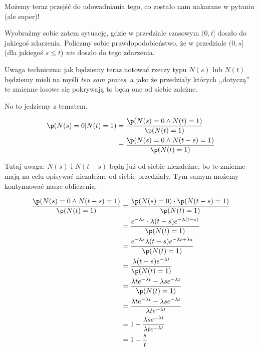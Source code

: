 Możemy teraz przejść do udowadniania tego, co zostało nam nakazane w pytaniu (ale super)!

Wyobraźmy sobie zatem sytuację, gdzie w przedziale czasowym \((0, t]\) doszło do jakiegoś zdarzenia. Policzmy sobie prawdopodobieństwo, że w przedziale \((0, s]\) (dla jakiegoś \(s \leq t\)) \textit{nie} doszło do tego zdarzenia.

Uwaga techniczna: jak będziemy teraz notować rzeczy typu \(N(s)\) lub \(N(t)\) będziemy mieli na myśli \textit{ten sam proces}, a jako że przedziały których ,,dotyczą'' te zmienne losowe się pokrywają to będą one od siebie zależne.

No to jedziemy z tematem.

\begin{align*}
	\p(N(s)=0 | N(t)=1) & = \frac{\p(N(s)=0 \land N(t)=1)}{\p(N(t)=1)}   \\
	                    & = \frac{\p(N(s)=0 \land N(t-s)=1)}{\p(N(t)=1)}
\end{align*}

Tutaj uwaga: \(N(s)\) i \(N(t-s)\) będą już od siebie niezależne, bo te zmienne mają na celu opisywać niezależne od siebie przedziały. Tym samym możemy kontynuować nasze obliczenia:

\begin{align*}
	\frac{\p(N(s)=0 \land N(t-s)=1)}{\p(N(t)=1)} & = \frac{\p(N(s)=0) \cdot \p(N(t-s)=1)}{\p(N(t)=1)}                                     \\
	                                             & = \frac{e^{-\lambda s} \cdot \lambda (t-s) e^{-\lambda (t-s)}}{\p(N(t)=1)}             \\
	                                             & = \frac{e^{-\lambda s} \lambda (t-s) e^{-\lambda t + \lambda s}}{\p(N(t)=1)}           \\
	                                             & = \frac{\lambda (t-s) e^{-\lambda t}}{\p(N(t)=1)}                                      \\
	                                             & = \frac{\lambda t e^{-\lambda t} - \lambda s e^{-\lambda t}}{\p(N(t)=1)}               \\
	                                             & = \frac{\lambda t e^{-\lambda t} - \lambda s e^{-\lambda t}}{\lambda t e^{-\lambda t}} \\
	                                             & = 1 - \frac{\lambda s e^{-\lambda t} }{\lambda t e^{-\lambda t}}                       \\
	                                             & = 1 - \frac{s}{t}
\end{align*}


